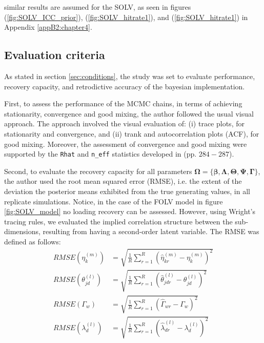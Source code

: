 similar results are assumed for the SOLV, as seen in figures (\ref{fig:SOLV_ICC_prior}), (\ref{fig:SOLV_hitrate1}), and (\ref{fig:SOLV_hitrate1}) in Appendix \ref{appB2:chapter4}.






\subsection{Evaluation criteria}

As stated in section \ref{sec:conditions}, the study was set to evaluate performance, recovery capacity, and retrodictive accuracy of the bayesian implementation.

First, to assess the performance of the MCMC chains, in terms of achieving stationarity, convergence and good mixing, the author followed the usual visual approach. The approach involved the visual evaluation of: (i) trace plots, for stationarity and convergence, and (ii) trank and autocorrelation plots (ACF), for good mixing. Moreover, the assessment of convergence and good mixing were supported by the \texttt{Rhat} and \texttt{n\_eff} statistics developed in \citet{Gelman_et_al_2014} (pp. $284-287$).

Second, to evaluate the recovery capacity for all parameters $\pmb{\Omega} = \{ \pmb{\beta}, \pmb{\Lambda}, \pmb{\Theta}, \pmb{\Psi}, \pmb{\Gamma} \}$, the author used the root mean squared error (RMSE), i.e. the extent of the deviation the posterior means exhibited from the true generating values, in all replicate simulations. Notice, in the case of the FOLV model in figure \ref{fig:SOLV_model} no loading recovery can be assessed. However, using Wright's tracing rules, we evaluated the implied correlation structure between the sub-dimensions, resulting from having a second-order latent variable. The RMSE was defined as follows:
%
\begin{align}
	RMSE \left( \eta^{(m)}_{k} \right) &=\sqrt{\frac{1}{R} \sum_{r=1}^{R} \left( \hat{\eta}^{(m)}_{kr} - \eta^{(m)}_{k} \right)^2} \\
	RMSE \left( \theta^{(l)}_{jd} \right) &=\sqrt{\frac{1}{R} \sum_{r=1}^{R} \left( \hat{\theta}^{(l)}_{jdr} - \theta^{(l)}_{jd} \right)^2} \\
	RMSE \left( \Gamma_{w} \right) &=\sqrt{\frac{1}{R} \sum_{r=1}^{R} \left( \hat{\Gamma}_{wr} - \Gamma_{w} \right)^2} \\
	RMSE \left( \lambda^{(l)}_{d} \right) &=\sqrt{\frac{1}{R} \sum_{r=1}^{R} \left( \hat{\lambda}^{(l)}_{dr} - \lambda^{(l)}_{d} \right)^2}
\end{align}

